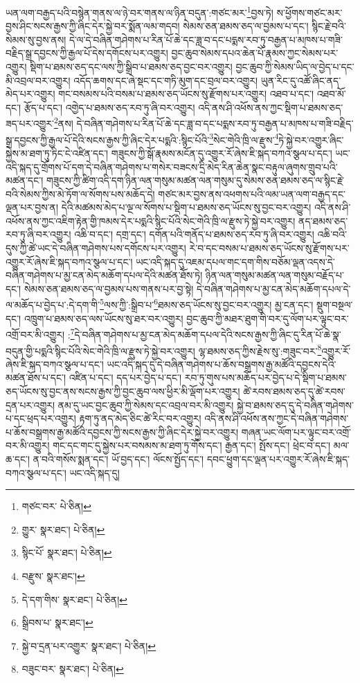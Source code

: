 ཡན་ལག་བརྒྱད་པའི་བསྙེན་གནས་ལ་ཉེ་བར་གནས་ལ་ཉིན་བདུན་:གཙང་མར་\footnote{གཙང་བར་  པེ་ཅིན། }བྱས་ཏེ། ས་ཕྱོགས་གཙང་མར་བྱས་ཤིང་སངས་རྒྱས་ཀྱི་ཞིང་དེར་སྐྱེ་བར་སྨོན་ལམ་གདབ། སེམས་ཅན་ཐམས་ཅད་ལ་བྱམས་པ་དང་། སྙིང་རྗེ་བའི་སེམས་སུ་བྱས་ནས། དེ་ལ་དེ་བཞིན་གཤེགས་པ་རིན་པོ་ཆེ་དང་ཟླ་བ་དང་པདྨས་རབ་ཏུ་བརྒྱན་པ་མཁས་པ་གཟི་བརྗིད་སྒྲ་དབྱངས་ཀྱི་རྒྱལ་པོ་དེས་དགོངས་པར་འགྱུར། བྱང་ཆུབ་སེམས་དཔའ་ཆེན་པོ་རྣམས་ཀྱང་སེམས་པར་འགྱུར། སྡིག་པ་ཐམས་ཅད་དང་ལས་ཀྱི་སྒྲིབ་པ་ཐམས་ཅད་བྱང་བར་འགྱུར། བྱང་ཆུབ་ཀྱི་སེམས་ཡིད་ལ་བྱེད་པ་དང་མི་འབྲལ་བར་འགྱུར། འདོད་ཆགས་དང་ཞེ་སྡང་དང་གཏི་མུག་དང་བྲལ་བར་འགྱུར། ཡུན་རིང་དུ་འཚོ་ཞིང་ནད་མེད་པར་འགྱུར། གང་བསམས་པའི་བསམ་པ་ཐམས་ཅད་ཡོངས་སུ་རྫོགས་པར་འགྱུར། འཐབ་པ་དང་། འཐབ་མོ་དང་། རྩོད་པ་དང་། འགྱེད་པ་ཐམས་ཅད་རབ་ཏུ་ཞི་བར་འགྱུར། འདི་ནས་ཤི་འཕོས་ནས་ཀྱང་སྡིག་པ་ཐམས་ཅད་ཟད་པར་འགྱུར་\footnote{གྱུར་  སྣར་ཐང་།  པེ་ཅིན། }ནས། དེ་བཞིན་གཤེགས་པ་རིན་པོ་ཆེ་དང་ཟླ་བ་དང་པདྨས་རབ་ཏུ་བརྒྱན་པ་མཁས་པ་གཟི་བརྗིད་སྒྲ་དབྱངས་ཀྱི་རྒྱལ་པོ་དེའི་སངས་རྒྱས་ཀྱི་ཞིང་དེར་པདྨའི་:སྙིང་པོའི་\footnote{སྙིང་པོ་  སྣར་ཐང་།  པེ་ཅིན། }སེང་གེའི་ཁྲི་ལ་རྫུས་\footnote{བརྫུས་  སྣར་ཐང་། }ཏེ་སྐྱེ་བར་འགྱུར་ཞིང་སྐྱེས་མ་ཐག་ཏུ་ཏིང་ངེ་འཛིན་དང་། གཟུངས་ཀྱི་སྒོ་རྣམས་མངོན་དུ་འགྱུར་རོ་ཞེས་ཇི་སྐད་བཀའ་སྩལ་པ་དང་། ཡང་འདི་སྐད་དུ་གྲོགས་པོ་དག་དེ་བཞིན་གཤེགས་པ་གསེར་བཟངས་དྲི་མེད་རིན་ཆེན་སྣང་བརྟུལ་ཞུགས་གྲུབ་པའི་མཚན་དང་། གཟུངས་ཀྱི་ཚིག་འདི་དག་ཉིན་ལན་གསུམ་མཚན་ལན་གསུམ་དུ་སེམས་ཅན་ཐམས་ཅད་ལ་སྙིང་རྗེ་བའི་སེམས་ཀྱིས་མེ་ཏོག་ལ་སོགས་པས་མཆོད་དེ། གཙང་མར་བྱས་ནས་འཕགས་པའི་ལམ་ཡན་ལག་བརྒྱད་དང་ལྡན་པར་བྱས་ན། དེའི་མཚམས་མེད་པ་ལྔ་ལ་སོགས་པ་སྡིག་པ་ཐམས་ཅད་ཡོངས་སུ་བྱང་བར་འགྱུར། འདི་ནས་ཤི་འཕོས་ནས་ཀྱང་འཇིག་རྟེན་གྱི་ཁམས་དེར་པདྨའི་སྙིང་པོའི་སེང་གེའི་ཁྲི་ལ་རྫུས་ཏེ་སྐྱེ་བར་འགྱུར། ནད་ཐམས་ཅད་རབ་ཏུ་ཞི་བར་འགྱུར། འཆི་བ་དང་། དགྲ་དང་། དགོན་པའི་གནོད་པ་ཐམས་ཅད་རབ་ཏུ་ཞི་བར་འགྱུར། འཆི་བའི་དུས་ཀྱི་ཚེ་ཡང་དེ་བཞིན་གཤེགས་པས་དགོངས་པར་འགྱུར། རེ་བ་དང་བསམ་པ་ཐམས་ཅད་ཡོངས་སུ་རྫོགས་པར་འགྱུར་རོ་ཞེས་ཇི་སྐད་བཀའ་སྩལ་པ་དང་། ཡང་འདི་སྐད་དུ་འཇམ་དཔལ་གང་དག་གིས་བཅོམ་ལྡན་འདས་དེ་བཞིན་གཤེགས་པ་མྱ་ངན་མེད་མཆོག་དཔལ་དེའི་མཚན་ཐོས་ཏེ། ཉིན་ལན་གསུམ་མཚན་ལན་གསུམ་བརྗོད་པ་དང་། སེམས་ཅན་ཐམས་ཅད་ལ་བྱམས་པས་གནས་པར་བྱ་སྟེ། དེ་བཞིན་གཤེགས་པ་མྱ་ངན་མེད་མཆོག་དཔལ་དེ་ལ་མཆོད་པ་བྱེད་པ་:དེ་དག་གི་\footnote{དེ་དག་གིས་  སྣར་ཐང་།  པེ་ཅིན། }ལས་ཀྱི་:སྒྲིབ་པ་\footnote{སྒྲིབས་པ་  སྣར་ཐང་། }ཐམས་ཅད་ཡོངས་སུ་བྱང་བར་འགྱུར། མྱ་ངན་དང་། སྡུག་བསྔལ་དང་། འཁྲུག་པ་ཐམས་ཅད་ལས་ཡོངས་སུ་ཐར་བར་འགྱུར། བྱང་ཆུབ་ཀྱི་མཐར་ཐུག་གི་བར་དུ་ལོག་པར་ལྟུང་བར་འགྲོ་བར་མི་འགྱུར། :\footnote{སྐྱེ་བ་དྲན་པར་འགྱུར་  སྣར་ཐང་།  པེ་ཅིན། }དེ་བཞིན་གཤེགས་པ་མྱ་ངན་མེད་མཆོག་དཔལ་དེའི་སངས་རྒྱས་ཀྱི་ཞིང་དུ་རིན་པོ་ཆེ་སྣ་བདུན་གྱི་པདྨའི་སྙིང་པོའི་སེང་གེའི་ཁྲི་ལ་རྫུས་ཏེ་སྐྱེ་བར་འགྱུར། ལྷ་ཐམས་ཅད་ཀྱིས་རྗེས་སུ་:གཟུང་བར་\footnote{བཟུང་བར་  སྣར་ཐང་།  པེ་ཅིན། }འགྱུར་རོ་ཞེས་ཇི་སྐད་བཀའ་སྩལ་པ་དང་། ཡང་འདི་སྐད་དུ་དེ་བཞིན་གཤེགས་པ་ཆོས་བསྒྲགས་རྒྱ་མཚོའི་དབྱངས་དེའི་མཚན་ཐོས་པ་དང་། འཛིན་པ་དང་། དད་པར་བྱེད་པ་དང་། རབ་ཏུ་གུས་པས་མཆོད་པར་བྱེད་པ་དེ་སྡིག་པ་ཐམས་ཅད་ཡོངས་སུ་བྱང་ནས་སངས་རྒྱས་ཀྱི་བྱང་ཆུབ་ལས་ཕྱིར་མི་ལྡོག་པར་འགྱུར། ཚེ་རབས་ཐམས་ཅད་དུ་ཚེ་རབས་དྲན་པར་འགྱུར། ནམ་དུ་ཡང་བྱང་ཆུབ་ཀྱི་སེམས་དང་འབྲལ་བར་མི་འགྱུར། སྐྱེ་བ་ཐམས་ཅད་དུ་དེ་བཞིན་གཤེགས་པ་དང་ཕྲད་པར་འགྱུར། རྟག་ཏུ་ནད་མེད་ཅིང་ཚེ་རིང་བར་འགྱུར། འདི་ནས་ཤི་འཕོས་ནས་ཀྱང་དེ་བཞིན་གཤེགས་པ་ཆོས་བསྒྲགས་རྒྱ་མཚོའི་དབྱངས་ཀྱི་སངས་རྒྱས་ཀྱི་ཞིང་དེར་སྐྱེ་བར་འགྱུར། གཞན་ཡང་ལོག་པར་ལྟུང་བར་འགྲོ་བར་མི་འགྱུར། གང་དང་གང་དུ་སྐྱེས་པར་བསམས་མ་ཐག་ཏུ་གོས་དང་། རྒྱན་དང་། སྤོས་དང་། ཕྲེང་བ་དང་། མལ་ཆ་དང་། ན་བའི་གསོས་སྨན་དང་། ཡོ་བྱད་དང་། ལོངས་སྤྱོད་དང་། དབང་ཕྱུག་དང་ལྡན་པར་འགྱུར་རོ་ཞེས་ཇི་སྐད་བཀའ་སྩལ་པ་དང་། ཡང་འདི་སྐད་དུ། 